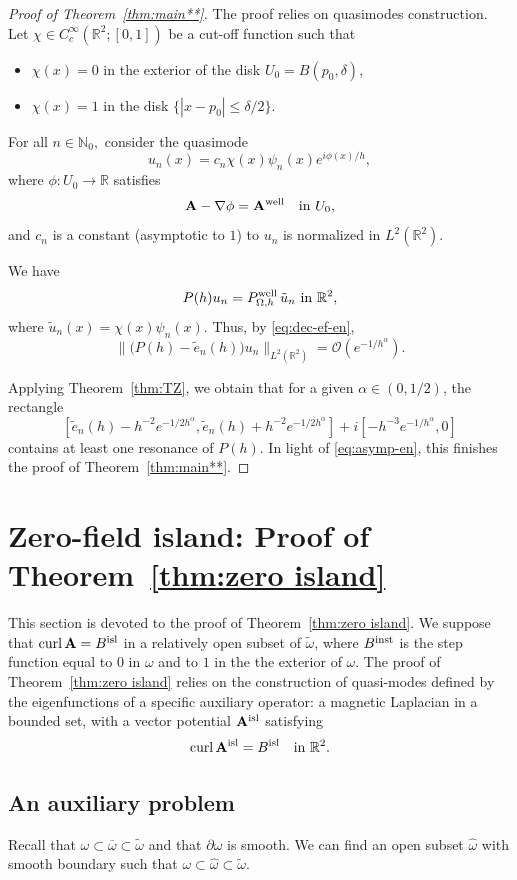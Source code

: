 \documentclass[11pt]{amsart}
\theoremstyle{remark}
\newcommand{\bA}{\mathbf{A}}
\newcommand{\R}{\mathbb{R}}
\DeclareMathOperator{\Curl}{curl}
\numberwithin{equation}{section}
\begin{document}
\begin{proof}[Proof of Theorem~\ref{thm:main**}]
The proof relies on quasimodes construction. Let 
$\chi\in C_c^\infty(\R^2;[0,1])$ be a cut-off function such that
\begin{itemize}
    \item $\chi(x)=0$ in the exterior of the disk $U_0=B(p_0,\delta)$,
    \item $\chi(x)=1$ in the disk $\{|x-p_0|\leq \delta/2\}$.
\end{itemize}
For all $n\in\mathbb N_0,$ consider the quasimode
\[u_n(x)=c_n\chi(x)\psi_n(x)e^{i\phi(x)/h},\]
where $\phi:U_0\to \mathbb R$ satisfies
\[\bA-\nabla\phi=\bA^{\rm well}\quad\mbox{in }U_0,\]
and $c_n$ is a constant (asymptotic to $1$) to $u_n$ is normalized in $L^2(\R^2)$.

We have
\[P(h)u_n=P^{\rm well}_{\Omega,h}\,\tilde u_n \mbox{ in }\R^2,\]
where $\tilde u_n(x)=\chi(x)\psi_n(x).$ 
Thus, by \eqref{eq:dec-ef-en},
\[\bigl\|\bigl(P(h)-\tilde e_n(h)\bigr)u_n\bigr\|_{L^2(\R^2)}=\mathcal O(e^{-1/h^{\alpha}}).\]

Applying Theorem~\ref{thm:TZ}, we obtain that for a given $\alpha\in(0,1/2)$, the rectangle
\[[\tilde e_n(h) - h^{-2}e^{-1/2h^\alpha}, \tilde e_n(h) + h^{-2}e^{-1/2h^\alpha}] + i[-h^{-3}e^{-1/h^{\alpha}}, 0]
\]
contains at least one resonance of $P(h)$. In light of \eqref{eq:asymp-en}, this finishes the proof of Theorem~\ref{thm:main**}.
\end{proof}

\section{Zero-field island: Proof of Theorem~\ref{thm:zero island}}\label{sec:zero island}

This section is devoted to the proof of Theorem~\ref{thm:zero island}. We suppose that $\Curl\bA=B^{\rm isl}$ in a relatively open subset of $\tilde\omega$, where $B^{\rm inst}$ is the step function equal to $0$ in $\omega$ and to $1$ in the the exterior of $\omega$. The proof of Theorem~\ref{thm:zero island} relies on the construction of quasi-modes defined by the eigenfunctions of a specific auxiliary operator: a magnetic Laplacian in a bounded set, with a vector potential $\bA^{\rm isl}$ satisfying
\[\Curl\bA^{\rm isl}=B^{\rm isl}\quad\mbox{in }\R^2.\]


\subsection{An auxiliary problem}
%
Recall that $\omega\subset\overline\omega\subset\tilde\omega$ and that $\partial\omega$ is smooth. We can find an open subset $\hat\omega$ with smooth boundary such that $\omega\subset\hat\omega\subset\tilde\omega$. 
\end{document}
